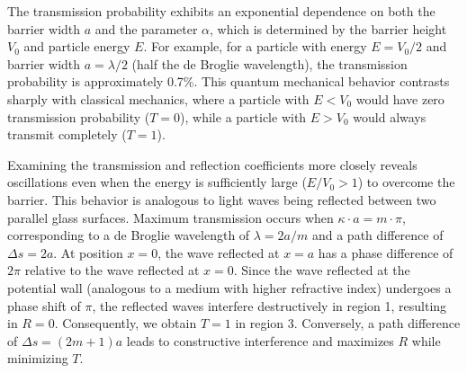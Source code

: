 \documentclass[
  a4paper,
]{book}
\begin{document}
The transmission probability exhibits an exponential dependence on both
the barrier width \(a\) and the parameter \(\alpha\), which is
determined by the barrier height \(V_0\) and particle energy \(E\). For
example, for a particle with energy \(E = V_0/2\) and barrier width
\(a = \lambda/2\) (half the de Broglie wavelength), the transmission
probability is approximately 0.7\%. This quantum mechanical behavior
contrasts sharply with classical mechanics, where a particle with
\(E < V_0\) would have zero transmission probability (\(T = 0\)), while
a particle with \(E > V_0\) would always transmit completely
(\(T = 1\)).

Examining the transmission and reflection coefficients more closely
reveals oscillations even when the energy is sufficiently large
(\(E / V_0 > 1\)) to overcome the barrier. This behavior is analogous to
light waves being reflected between two parallel glass surfaces. Maximum
transmission occurs when \(\kappa \cdot a = m \cdot \pi\), corresponding
to a de Broglie wavelength of \(\lambda = 2a/m\) and a path difference
of \(\Delta s = 2a\). At position \(x = 0\), the wave reflected at
\(x = a\) has a phase difference of \(2\pi\) relative to the wave
reflected at \(x = 0\). Since the wave reflected at the potential wall
(analogous to a medium with higher refractive index) undergoes a phase
shift of \(\pi\), the reflected waves interfere destructively in region
1, resulting in \(R = 0\). Consequently, we obtain \(T = 1\) in region
3. Conversely, a path difference of \(\Delta s = (2m + 1)a\) leads to
constructive interference and maximizes \(R\) while minimizing \(T\).
\end{document}
